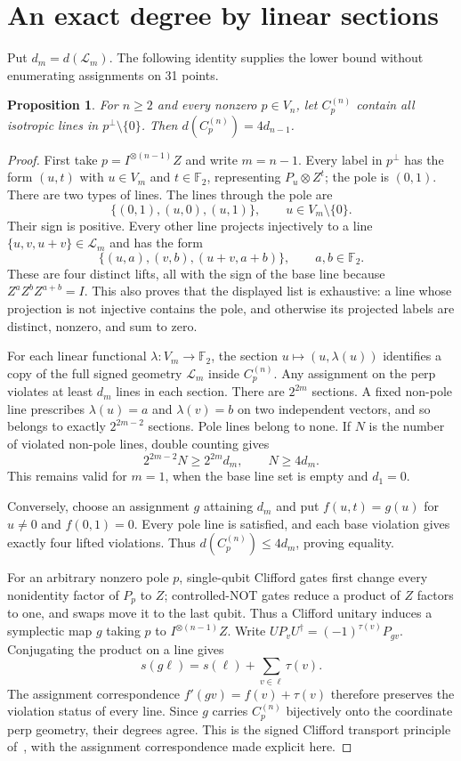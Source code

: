 \documentclass[10pt]{article}
\newtheorem{proposition}[theorem]{Proposition}
\newcommand{\FF}{\mathbb F_2}
\newcommand{\LL}{\mathcal L}
\begin{document}
\section{An exact degree by linear sections}
Put $d_m=d(\LL_m)$. The following identity supplies the lower bound without
enumerating assignments on 31 points.
\begin{proposition}\label{prop:lift}
For $n\ge2$ and every nonzero $p\in V_n$, let $C^{(n)}_p$ contain all isotropic
lines in $p^\perp\setminus\{0\}$. Then $d(C^{(n)}_p)=4d_{n-1}$.
\end{proposition}
\begin{proof}
First take $p=I^{\otimes(n-1)}Z$ and write $m=n-1$.
Every label in $p^\perp$ has the form $(u,t)$ with
$u\in V_m$ and $t\in\FF$, representing $P_u\otimes Z^t$; the pole is
$(0,1)$. There are two types of lines. The lines through the pole are
\[
 \{(0,1),(u,0),(u,1)\},\qquad u\in V_m\setminus\{0\}.
\]
Their sign is positive. Every other line projects injectively to a line
$\{u,v,u+v\}\in\LL_m$ and has the form
\[
 \{(u,a),(v,b),(u+v,a+b)\},\qquad a,b\in\FF.
\]
These are four distinct lifts, all with the sign of the base line because
$Z^aZ^bZ^{a+b}=I$. This also proves that the displayed list is exhaustive:
a line whose projection is not injective contains the pole, and otherwise
its projected labels are distinct, nonzero, and sum to zero.

For each linear functional $\lambda:V_m\to\FF$, the section
$u\mapsto(u,\lambda(u))$ identifies a copy of the full signed geometry
$\LL_m$ inside $C^{(n)}_p$. Any assignment on the perp violates at least
$d_m$ lines in each section. There are $2^{2m}$ sections. A fixed non-pole
line prescribes $\lambda(u)=a$ and $\lambda(v)=b$ on two independent
vectors, and so belongs to exactly $2^{2m-2}$ sections. Pole lines belong
to none. If $N$ is the number of violated non-pole lines, double counting gives
\[
 2^{2m-2}N\ge2^{2m}d_m,\qquad N\ge4d_m.
\]
This remains valid for $m=1$, when the base line set is empty and $d_1=0$.

Conversely, choose an assignment $g$ attaining $d_m$ and put
$f(u,t)=g(u)$ for $u\ne0$ and $f(0,1)=0$. Every pole line is satisfied,
and each base violation gives exactly four lifted violations. Thus
$d(C^{(n)}_p)\le4d_m$, proving equality.

For an arbitrary nonzero pole $p$, single-qubit Clifford gates first change
every nonidentity factor of $P_p$ to $Z$; controlled-NOT gates reduce a product
of $Z$ factors to one, and swaps move it to the last qubit. Thus a Clifford
unitary induces a symplectic map $g$ taking $p$ to $I^{\otimes(n-1)}Z$.
Write $UP_vU^\dagger=(-1)^{\tau(v)}P_{gv}$. Conjugating the product on a line
gives
\[
 s(g\ell)=s(\ell)+\sum_{v\in\ell}\tau(v).
\]
The assignment correspondence $f'(gv)=f(v)+\tau(v)$ therefore preserves the
violation status of every line. Since $g$ carries $C^{(n)}_p$ bijectively
onto the coordinate perp geometry, their degrees agree. This is the signed
Clifford transport principle of~\cite[Lemma~3]{li}, with the assignment
correspondence made explicit here.
\end{proof}
\end{document}
